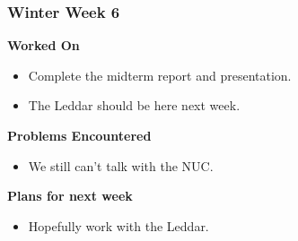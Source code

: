 \documentclass[compsoc,draftclsnofoot,onecolumn,10pt]{IEEEtran}
\begin{document}
\subsubsection*{Winter Week 6}
\textbf{Worked On}
\begin{itemize}
    \item Complete the midterm report and presentation. 
    \item The Leddar should be here next week. 
\end{itemize}
\textbf{Problems Encountered}
\begin{itemize}
    \item We still can't talk with the NUC.
\end{itemize}
\textbf{Plans for next week}
\begin{itemize}
    \item Hopefully work with the Leddar.
\end{itemize}
\end{document}
